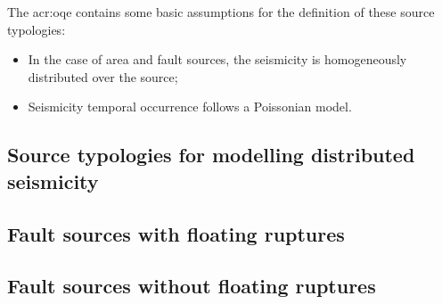 The \glsdesc{acr:oqe} contains some basic assumptions for the definition of
these source typologies:

\begin{itemize}

    \item In the case of area and fault sources, the seismicity is
    homogeneously distributed over the source;

    \item Seismicity temporal occurrence follows a Poissonian model.

\end{itemize}



\subsection{Source typologies for modelling distributed seismicity}


\subsection{Fault sources with floating ruptures}


\subsection{Fault sources without floating ruptures}

